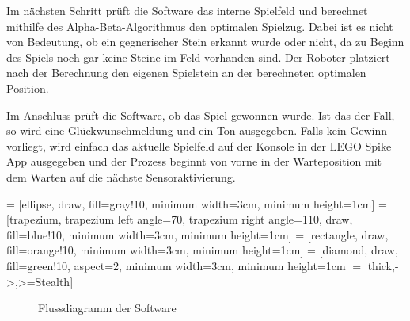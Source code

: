 Im nächsten Schritt prüft die Software das interne Spielfeld und berechnet mithilfe des Alpha-Beta-Algorithmus den optimalen Spielzug.
Dabei ist es nicht von Bedeutung, ob ein gegnerischer Stein erkannt wurde oder nicht, da zu Beginn des Spiels noch gar keine Steine im Feld vorhanden sind.
Der Roboter platziert nach der Berechnung den eigenen Spielstein an der berechneten optimalen Position.

Im Anschluss prüft die Software, ob das Spiel gewonnen wurde. Ist das der Fall, so wird eine Glückwunschmeldung und ein Ton ausgegeben. Falls kein Gewinn vorliegt, wird einfach das aktuelle Spielfeld auf der Konsole in der LEGO Spike App ausgegeben und der Prozess beginnt von vorne in der Warteposition mit dem Warten auf die nächste Sensoraktivierung. 




 = [ellipse, draw, fill=gray!10, minimum width=3cm, minimum height=1cm]
 = [trapezium, trapezium left angle=70, trapezium right angle=110, draw, fill=blue!10, minimum width=3cm, minimum height=1cm]
 = [rectangle, draw, fill=orange!10, minimum width=3cm, minimum height=1cm]
 = [diamond, draw, fill=green!10, aspect=2, minimum width=3cm, minimum height=1cm]
 = [thick,->,>=Stealth]

\begin{figure}[H]


	\caption[Flussdiagramm]{Flussdiagramm der Software}
\label{fig:Flussdiagramm}
\end{figure}

